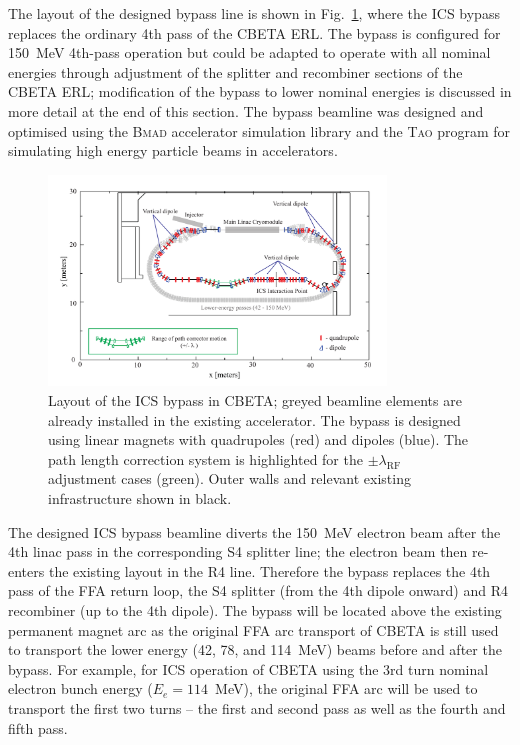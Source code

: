 \documentclass[../main.tex]{subfiles}
\begin{document}
The layout of the designed bypass line is shown in Fig.~\ref{fig:CBETA_ICS_Layout}, where the ICS bypass replaces the ordinary 4th pass of the CBETA ERL. The bypass is configured for 150~\si{\mega\electronvolt} 4th-pass operation but could be adapted to operate with all nominal energies through adjustment of the splitter and recombiner sections of the CBETA ERL; modification of the bypass to lower nominal energies is discussed in more detail at the end of this section. The bypass beamline was designed and optimised using the \textsc{Bmad} accelerator simulation library \cite{BmadManual} and the \textsc{Tao} program \cite{TaoManual} for simulating high
energy particle beams in accelerators.
\begin{figure}[!h]
\centering
\includegraphics[width=0.8\textwidth]{Figures/CBETA_Inverse_Compton_Source_Design/cbetaicslayout.pdf}
\caption{Layout of the ICS bypass in CBETA; greyed beamline elements are already installed in the existing accelerator. The bypass is designed using linear magnets with quadrupoles (red) and dipoles (blue). The path length correction system is highlighted for the $\pm\lambda_{\mathrm{RF}}$ adjustment cases (green). Outer walls and relevant existing infrastructure shown in black.}
\label{fig:CBETA_ICS_Layout}
\end{figure}
The designed ICS bypass beamline diverts the 150~\si{\mega\electronvolt} electron beam after the 4th linac pass in the corresponding S4 splitter line; the electron beam then re-enters the existing layout in the R4 line. Therefore the bypass replaces the 4th pass of the FFA return loop, the S4 splitter (from the 4th dipole onward) and R4 recombiner (up to the 4th dipole). The bypass will be located above the existing permanent magnet arc as the original FFA arc transport of CBETA is still used to transport the lower energy (42, 78, and 114~MeV) beams before and after the bypass. For example, for ICS operation of CBETA using the 3rd turn nominal electron bunch energy ($E_{e} = 114$~\si{\mega\electronvolt}), the original FFA arc will be used to transport the first two turns -- the first and second pass as well as the fourth and fifth pass. 
\end{document}
